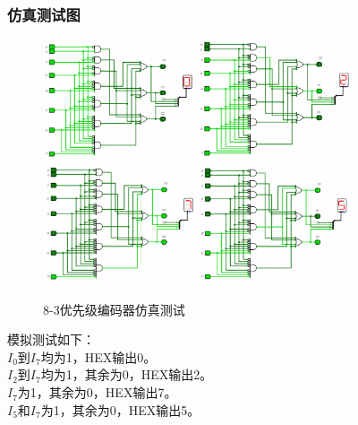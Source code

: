 \documentclass{article}
\begin{document}
    \subsubsection{仿真测试图}
    \begin{figure}[H]
    \centering
    \includegraphics[width=0.4\textwidth]{2.5.1.png}
    \includegraphics[width=0.4\textwidth]{2.5.2.png}
    \includegraphics[width=0.4\textwidth]{2.5.3.png}
    \includegraphics[width=0.4\textwidth]{2.5.4.png}
    \caption{8-3优先级编码器仿真测试}
    \end{figure}
    模拟测试如下：\\
    $I_{0}$到$I_{7}$均为1，HEX输出0。\\
    $I_2$到$I_7$均为1，其余为0，HEX输出2。\\
    $I_7$为1，其余为0，HEX输出7。\\
    $I_5$和$I_7$为1，其余为0，HEX输出5。\\
\end{document}
